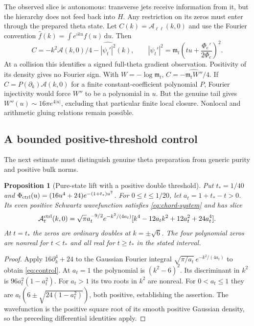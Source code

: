 \documentclass[11pt]{article}
\newtheorem{proposition}[theorem]{Proposition}
\theoremstyle{definition}
\theoremstyle{remark}
\newcommand{\dd}{\,\mathrm d}
\begin{document}
The observed slice is autonomous: transverse jets receive information
from it, but the hierarchy does not feed back into $H$. Any restriction
on its zeros must enter through the prepared theta state. Let
$C(k)=\mathcal A_{\ell\ell}(k,0)$ and use the Fourier convention
$\widehat f(k)=\int e^{iku}f(u)\dd u$. Then
\begin{equation}
 C=-k^2\mathcal A(k,0)/4-\widehat{|\psi_t'|^2}(k),
 \qquad |\psi_t'|^2=\mathfrak m_t\left(tu+\frac{\Phi_e'}{2\Phi_e}\right)^2.
 \label{eq:gradient-source}
\end{equation}
At a collision this identifies a signed full-theta gradient observation.
Positivity of its density gives no Fourier sign. With $W=-\log \mathfrak m_t$,
$C=-\widehat{\mathfrak m_tW''}/4$. If $C=P(\partial_k)\mathcal A(k,0)$ for a
finite constant-coefficient polynomial $P$, Fourier injectivity would
force $W''$ to be a polynomial in $u$. But the genuine tail gives
$W''(u)\sim16\pi e^{4|u|}$, excluding that particular finite local
closure. Nonlocal and arithmetic gluing relations remain possible.

\subsection{A bounded positive-threshold control}

The next estimate must distinguish genuine theta preparation from
generic purity and positive bulk norms.

\begin{proposition}[Pure-state lift with a positive double threshold]
\label{prop:control}
Put $t_*=1/40$ and
$\Phi_{\rm ctrl}(u)=(16u^4+24)e^{-(1+t_*)u^2}$.
For $0\le t\le1/20$, let $a_t=1+t_*-t>0$. Its even positive Schwartz
wavefunction satisfies \eqref{eq:chord-system} and has slice
\begin{equation}
 \mathcal A_t^{\rm ctrl}(k,0)=\sqrt\pi a_t^{-9/2}
 e^{-k^2/(4a_t)}
 [k^4-12a_tk^2+12a_t^2+24a_t^4].
 \label{eq:control}
\end{equation}
At $t=t_*$ the zeros are ordinary doubles at $k=\pm\sqrt6$.
The four polynomial zeros are nonreal for $t<t_*$ and all real for
$t\ge t_*$ in the stated interval.
\end{proposition}
\begin{proof}
Apply $16\partial_k^4+24$ to the Gaussian Fourier integral
$\sqrt{\pi/a_t}\,e^{-k^2/(4a_t)}$ to obtain
\eqref{eq:control}. At $a_t=1$ the polynomial is $(k^2-6)^2$.
Its discriminant in $k^2$ is $96a_t^2(1-a_t^2)$.
For $a_t>1$ its two roots in $k^2$ are nonreal. For $0<a_t\le1$ they
are $a_t(6\pm\sqrt{24(1-a_t^2)})$, both positive, establishing the
assertion. The wavefunction is the positive square root of its smooth
positive Gaussian density, so the preceding differential identities apply.
\end{proof}
\end{document}
